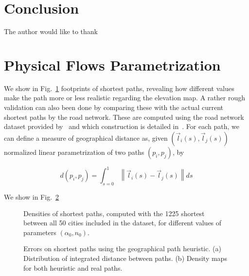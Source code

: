\documentclass[Royal,sageh,times]{sagej}
\newcommand{\norm}[1]{\left\lVert #1 \right\rVert}
\begin{document}
\section*{Conclusion}






\begin{acks}
The author would like to thank
\end{acks}












\section*{Physical Flows Parametrization}

We show in Fig.~\ref{fig:shortest-path-densities} footprints of shortest paths, revealing how different values make the path more or less realistic regarding the elevation map. A rather rough validation can also been done by comparing these with the actual current shortest paths by the road network. These are computed using the road network dataset provided by~\cite{} %
and which construction is detailed in~\cite{}. %
For each path, we can define a measure of geographical distance as, given $(\vec{l}_i (s), \vec{l}_j (s))$ normalized linear parametrization of two paths $(p_i,p_j)$, by

\[
d(p_i,p_j) = \int_{s=0}^1 \norm{\vec{l}_i (s) - \vec{l}_j (s)} ds
\] 

We show in Fig.~\ref{fig:paths-geodistance}


\begin{figure}

\caption{Densities of shortest paths, computed with the 1225 shortest between all 50 cities included in the dataset, for different values of parameters $(\alpha_0,n_0)$.}
\label{fig:shortest-path-densities}
\end{figure}


\begin{figure}

\caption{Errors on shortest paths using the geographical path heuristic. (a) Distribution of integrated distance between paths. (b) Density maps for both heuristic and real paths.}
\label{fig:paths-geodistance}
\end{figure}



\end{document}
